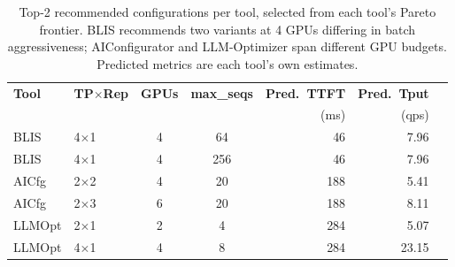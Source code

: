 
\begin{table}[t]
  \centering
  \small
  \caption{Top-2 recommended configurations per tool, selected from each tool's Pareto frontier. BLIS recommends two variants at 4 GPUs differing in batch aggressiveness; AIConfigurator and LLM-Optimizer span different GPU budgets. Predicted metrics are each tool's own estimates.}
  \label{tab:top2}
  \begin{tabular}{@{}llccrrr@{}}
    \toprule
    \textbf{Tool} & \textbf{TP$\times$Rep} & \textbf{GPUs} & \textbf{max\_seqs} & \textbf{Pred.\ TTFT} & \textbf{Pred.\ Tput} \\
    & & & & (ms) & (qps) \\
    \midrule
    BLIS & 4$\times$1 & 4 & 64 & 46 & 7.96 \\
    BLIS & 4$\times$1 & 4 & 256 & 46 & 7.96 \\
    \midrule
    AICfg & 2$\times$2 & 4 & 20 & 188 & 5.41 \\
    AICfg & 2$\times$3 & 6 & 20 & 188 & 8.11 \\
    \midrule
    LLMOpt & 2$\times$1 & 2 & 4 & 284 & 5.07 \\
    LLMOpt & 4$\times$1 & 4 & 8 & 284 & 23.15 \\
    \bottomrule
  \end{tabular}
\end{table}

